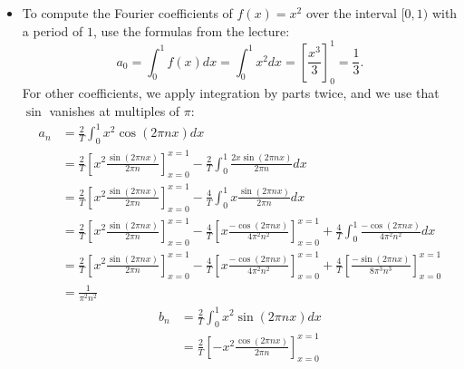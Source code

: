 \documentclass[11pt]{article}
\begin{document}
\begin{solution}     
    \begin{itemize}
        \item 
        To compute the Fourier coefficients of $f(x) = x^2$ over the interval $[0,1)$ with a period of $1$, use the formulas from the lecture:
        \[
            a_0 = \int_{0}^{1} f(x) dx  = \int_{0}^{1} x^2 dx  = \left[ \frac{x^3}{3} \right]_{0}^{1} = \frac 1 3.
        \]
        For other coefficients, we apply integration by parts twice, and we use that $\sin$ vanishes at multiples of $\pi$:
        \begin{align*}
            a_n 
            &
            = 
            \frac{2}{T}
            \int_{0}^{1} x^2 \cos(2\pi n x) dx
            \\&
            =
            \frac{2}{T}
            \left[ x^2 \frac{ \sin(2\pi n x) }{ 2\pi n } \right]_{x=0}^{x=1}
            -
            \frac{2}{T}
            \int_{0}^{1} \frac{ 2x \sin(2\pi n x) }{ 2\pi n } dx
            \\&
            =
            \frac{2}{T}
            \left[ x^2 \frac{ \sin(2\pi n x) }{ 2\pi n } \right]_{x=0}^{x=1}
            -
            \frac{4}{T}
            \int_{0}^{1} x \frac{ \sin(2\pi n x) }{ 2\pi n } dx
            \\&
            =
            \frac{2}{T}
            \left[ x^2 \frac{ \sin(2\pi n x) }{ 2\pi n } \right]_{x=0}^{x=1}
            -
            \frac{4}{T}
            \left[ x \frac{ -\cos(2\pi n x) }{ 4\pi^2 n^2 } \right]_{x=0}^{x=1}
            +
            \frac{4}{T}
            \int_{0}^{1} \frac{ -\cos(2\pi n x) }{ 4\pi^2 n^2 } dx
            \\&
            =
            \frac{2}{T}
            \left[ x^2 \frac{ \sin(2\pi n x) }{ 2\pi n } \right]_{x=0}^{x=1}
            -
            \frac{4}{T}
            \left[ x \frac{ -\cos(2\pi n x) }{ 4\pi^2 n^2 } \right]_{x=0}^{x=1}
            +
            \frac{4}{T}
            \left[ \frac{ -\sin(2\pi n x) }{ 8\pi^3 n^3 } \right]_{x=0}^{x=1}
            \\&
            = 
            \frac{1}{\pi^2 n^2}
        \end{align*}
        \begin{align*}
            b_n 
            &
            = 
            \frac{2}{T}
            \int_{0}^{1} x^2 \sin(2\pi n x) dx
            \\&
            =
            \frac{2}{T}
            \left[- x^2 \frac{ \cos(2\pi n x) }{ 2\pi n } \right]_{x=0}^{x=1}

\end{align*}
\end{itemize}
\end{solution}
\end{document}
